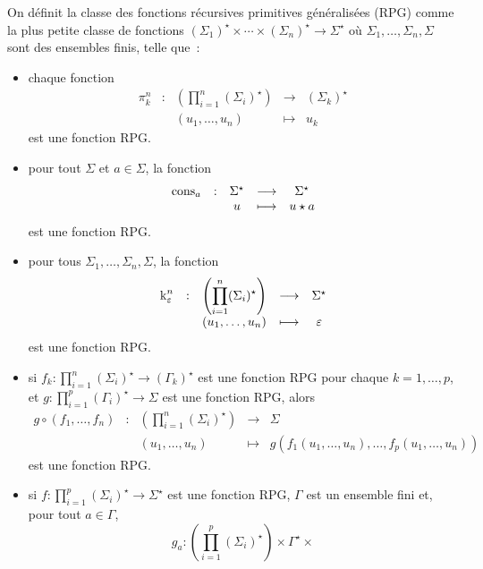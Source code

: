 \begin{definition}
  On définit la classe des fonctions récursives primitives généralisées
  (RPG) comme la plus petite classe de fonctions
  $(\Sigma_1)^\star\times\cdots\times(\Sigma_n)^\star\to \Sigma^\star$
  où $\Sigma_1,\ldots,\Sigma_n,\Sigma$ sont des ensembles finis, telle que~:
  \begin{itemize}
  \item chaque fonction
    \[\begin{array}{ccccc}
    \pi_k^n & : &\displaystyle \left(\prod_{i = 1}^n (\Sigma_i)^\star\right)&
    \longrightarrow & (\Sigma_k)^\star\\
    & & (u_1,\ldots,u_n) & \longmapsto & u_k
    \end{array}\]
    est une fonction RPG.
  \item pour tout $\Sigma$ et $a \in \Sigma$, la fonction
    \[\begin{array}{ccccc}
    \operatorname{cons}_a & : & \Sigma^\star & \longrightarrow & \Sigma^\star\\
    & & u & \longmapsto & u\star a
    \end{array}\]
    est une fonction RPG.
  \item pour tous $\Sigma_1,\ldots,\Sigma_n,\Sigma$, la fonction
    \[\begin{array}{ccccc}
    \operatorname{k}_\varepsilon^n &: & \displaystyle
    \left(\prod_{i = 1}^n (\Sigma_i)^\star\right) &\longrightarrow& \Sigma^\star\\
    & & (u_1,\ldots,u_n) & \longmapsto & \varepsilon
    \end{array}\]
    est une fonction RPG.
  \item si $f_k : \prod_{i = 1}^n (\Sigma_i)^\star \to (\Gamma_k)^\star$ est une
    fonction RPG pour chaque $k = 1,\ldots,p$, et
    $g : \prod_{i = 1}^p (\Gamma_i)^\star \to \Sigma$ est une fonction RPG, alors
    \[\begin{array}{ccccc}
    g\circ (f_1,\ldots,f_n) & : & \displaystyle
    \left(\prod_{i = 1}^n (\Sigma_i)^\star\right) &
    \longrightarrow & \Sigma\\
    & & (u_1,\ldots,u_n) &\longmapsto &
    g(f_1(u_1,\ldots,u_n),\ldots,f_p(u_1,\ldots,u_n))
    \end{array}\]
    est une fonction RPG.
  \item si $f : \prod_{i = 1}^p (\Sigma_i)^\star \to \Sigma^\star$ est une
    fonction RPG, $\Gamma$ est un ensemble fini et, pour tout $a\in \Gamma$,
    \[g_a : \left(\prod_{i = 1}^p (\Sigma_i)^\star\right)\times \Gamma^\star\times
\]
\end{itemize}
\end{definition}
